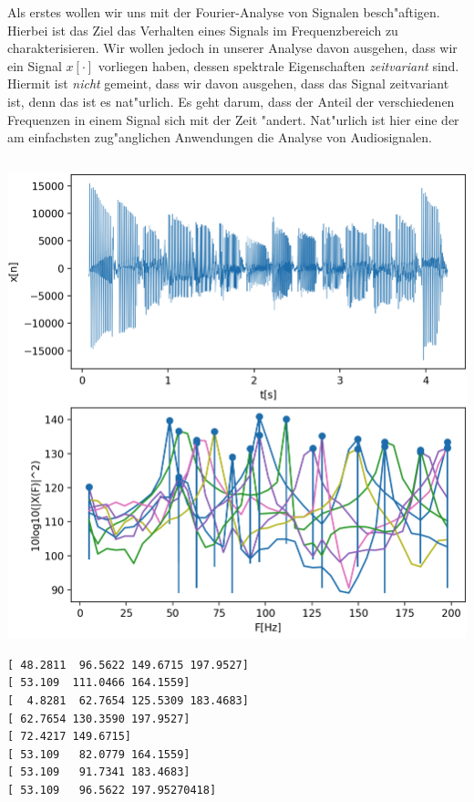 Als erstes wollen wir uns mit der Fourier-Analyse von Signalen besch"aftigen.
Hierbei ist das Ziel das Verhalten eines Signals im Frequenzbereich zu charakterisieren.
Wir wollen jedoch in unserer Analyse davon ausgehen, dass wir ein Signal $x[\cdot]$ vorliegen haben, dessen spektrale Eigenschaften \emph{zeitvariant} sind.
Hiermit ist \emph{nicht} gemeint, dass wir davon ausgehen, dass das Signal zeitvariant ist, denn das ist es nat"urlich.
Es geht darum, dass der Anteil der verschiedenen Frequenzen in einem Signal sich mit der Zeit "andert.
Nat"urlich ist hier eine der am einfachsten zug"anglichen Anwendungen die Analyse von Audiosignalen.

\begin{listing}[ht]
    \noindent
    \begin{minipage}{0.51\textwidth}
        \strut\vspace*{-\baselineskip}\newline
        \inputminted[firstline=10, lastline=44]{python3}{code/stft_1.py}
    \end{minipage}%
    \begin{minipage}{0.48\textwidth}
        \strut\vspace*{-\baselineskip}\newline
        \includegraphics[width=\textwidth]{code/stft_1.png}

\begin{verbatim}
[ 48.2811  96.5622 149.6715 197.9527]
[ 53.109  111.0466 164.1559]
[  4.8281  62.7654 125.5309 183.4683]
[ 62.7654 130.3590 197.9527]
[ 72.4217 149.6715]
[ 53.109   82.0779 164.1559]
[ 53.109   91.7341 183.4683]
[ 53.109   96.5622 197.95270418]
\end{verbatim}
    \end{minipage}
    \label{py:stft_1}
\end{listing}


